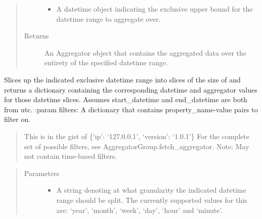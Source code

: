 \documentclass[letterpaper,10pt,english]{sphinxmanual}
\begin{document}
\begin{fulllineitems}
\begin{fulllineitems}
\begin{quote}
\begin{description}
\begin{itemize}
\item {} 
 \textendash{} A datetime object indicating the exclusive upper bound for the datetime range to
aggregate over.

\end{itemize}

\item[{Returns}] \leavevmode
An Aggregator object that contains the aggregated data over the entirety of the specified datetime
range.

\end{description}\end{quote}

\end{fulllineitems}


\begin{fulllineitems}
\label{\detokenize{pydash_app.dashboard.aggregator.aggregator_group:pydash_app.dashboard.aggregator.aggregator_group.AggregatorGroup.fetch_aggregators_per_timeslice}}
Slices up the indicated exclusive datetime range into slices of the size of  and returns a dictionary
containing the corresponding datetime and aggregator values for those datetime slices.
Assumes start\_datetime and end\_datetime are both from utc.
:param filters: A dictionary that contains property\_name-value pairs to filter on.
\begin{quote}

This is in the gist of \{‘ip’: ‘127.0.0.1’, ‘version’: ‘1.0.1’\}
For the complete set of possible filters, see AggregatorGroup.fetch\_aggregator.
Note: May not contain time-based filters.
\end{quote}
\begin{quote}\begin{description}
\item[{Parameters}] \leavevmode\begin{itemize}
\item {} 
 \textendash{} A string denoting at what granularity the indicated datetime range should be split.
The currently supported values for this are: ‘year’, ‘month’, ‘week’, ‘day’, ‘hour’ and ‘minute’.


\end{itemize}
\end{description}
\end{quote}
\end{fulllineitems}
\end{fulllineitems}
\end{document}
